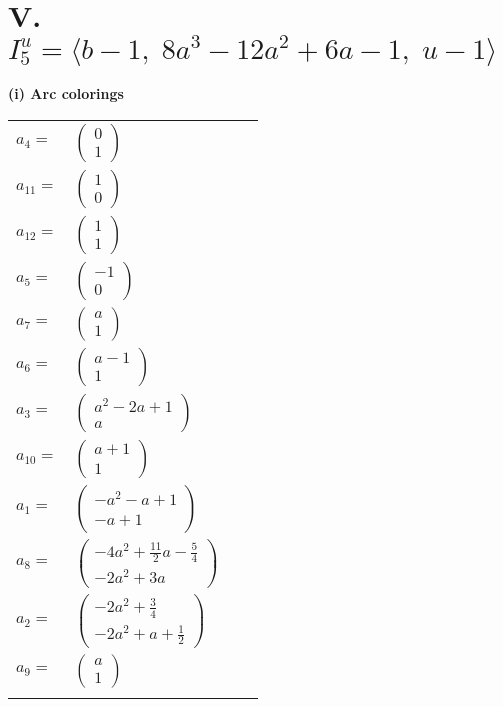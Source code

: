 \documentclass[1p]{elsarticle_modified}
\theoremstyle{definition}
\begin{document}
\centering \section*{V. $I^u_{5}= \langle b-1,\;8 a^3-12 a^2+6 a-1,\;u-1 \rangle$}
\flushleft \textbf{(i) Arc colorings}\\
\begin{tabular}{m{7pt} m{180pt} m{7pt} m{180pt} }
\flushright $a_{4}=$&$\begin{pmatrix}0\\1\end{pmatrix}$ \\
\flushright $a_{11}=$&$\begin{pmatrix}1\\0\end{pmatrix}$ \\
\flushright $a_{12}=$&$\begin{pmatrix}1\\1\end{pmatrix}$ \\
\flushright $a_{5}=$&$\begin{pmatrix}-1\\0\end{pmatrix}$ \\
\flushright $a_{7}=$&$\begin{pmatrix}a\\1\end{pmatrix}$ \\
\flushright $a_{6}=$&$\begin{pmatrix}a-1\\1\end{pmatrix}$ \\
\flushright $a_{3}=$&$\begin{pmatrix}a^2-2 a+1\\a\end{pmatrix}$ \\
\flushright $a_{10}=$&$\begin{pmatrix}a+1\\1\end{pmatrix}$ \\
\flushright $a_{1}=$&$\begin{pmatrix}- a^2- a+1\\- a+1\end{pmatrix}$ \\
\flushright $a_{8}=$&$\begin{pmatrix}-4 a^2+\frac{11}{2} a-\frac{5}{4}\\-2 a^2+3 a\end{pmatrix}$ \\
\flushright $a_{2}=$&$\begin{pmatrix}-2 a^2+\frac{3}{4}\\-2 a^2+a+\frac{1}{2}\end{pmatrix}$ \\
\flushright $a_{9}=$&$\begin{pmatrix}a\\1\end{pmatrix}$\\&\end{tabular}
\end{document}
